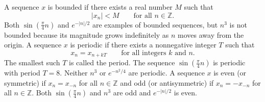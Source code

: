 \documentclass[11pt,a4paper]{book}
\theoremstyle{plain}
\numberwithin{equation}{section}
\newcommand{\reals}{{\mathbb R}}
\newcommand{\ints}{{\mathbb Z}}
\newcommand{\term}{\textbf}
\newcommand{\sabs}[1]{\vert #1 \vert}
\begin{document}
A sequence $x$ is bounded if there exists a real number $M$ such that 
\[
\sabs{x_n} < M \qquad \text{for all $n \in \ints$}.
\]
Both $\sin( \tfrac{\pi}{4} n)$ and $e^{-\sabs{n}/2}$ are examples of bounded sequences, but $n^3$ is not bounded because its magnitude grows indefinitely as $n$ moves away from the origin.  A sequence $x$ is periodic if there exists a nonnegative integer $T$ such that
\[
x_n = x_{n + kT} \qquad \text{for all integers $k$ and $n$.}
\] 
The smallest such $T$ is called the period.  The sequence $\sin( \tfrac{\pi}{4} n )$ is periodic with period $T=8$.  Neither $n^3$ or $e^{-n^2/4}$ are periodic.  
A sequence $x$ is even (or symmetric) if $x_n = x_{-n}$ for all $n \in \ints$ and odd (or antisymmetric) if $x_n = -x_{-n}$ for all $n \in \ints$.  Both $\sin(\frac{\pi}{4} n)$ and $n^3$ are odd and $e^{-\sabs{n}/2}$ is even.  
\end{document}
